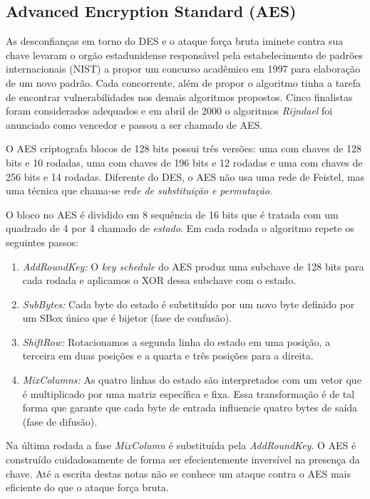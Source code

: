 
\subsection{Advanced Encryption Standard (AES)}
\label{sec:aes}

As desconfianças em torno do DES e o ataque força bruta iminete contra sua chave levaram o orgão estadunidense responsável pela estabelecimento de padrões internacionais (NIST) a propor um concurso acadêmico em 1997 para elaboração de um novo padrão.
Cada concorrente, além de propor o algoritmo tinha a tarefa de encontrar vulnerabilidades nos demais algoritmos propostos.
Cinco finalistas foram considerados adequados e em abril de 2000 o algoritmos {\em Rijndael} foi anunciado como vencedor e passou a ser chamado de AES.

O AES criptografa blocos de 128 bits possui três versões: uma com chaves de 128 bits e 10 rodadas, uma com chaves de 196 bits e 12 rodadas e uma com chaves de 256 bits e 14 rodadas.
Diferente do DES, o AES não usa uma rede de Feistel, mas uma técnica que chama-se {\em rede de substituição e permutação}.

O bloco no AES é dividido em 8 sequência de 16 bits que é tratada com um quadrado de 4 por 4 chamado de {\em estado}.
Em cada rodada o algoritmo repete os seguintes passos:
\begin{enumerate}
\item {\em AddRoundKey:} O {\em key schedule} do AES produz uma subchave de 128 bits para cada rodada e aplicamos o XOR dessa subchave com o estado.
\item {\em SubBytes:} Cada byte do estado é substituído por um novo byte definido por um SBox único que é bijetor (fase de confusão).
\item {\em ShiftRow:} Rotacionamos a segunda linha do estado em uma posição, a terceira em duas posições e a quarta e três posições para a direita.
\item {\em MixColumns:} As quatro linhas do estado são interpretados com um vetor que é multiplicado por uma matriz específica e fixa. Essa transformação é de tal forma que garante que cada byte de entrada influencie quatro bytes de saída (fase de difusão). 
\end{enumerate}

Na última rodada a fase {\em MixColumn} é substituída pela {\em AddRoundKey}.
O AES é construído cuidadosamente de forma ser efecientemente inversível na presença da chave.
Até a escrita destas notas não se conhece um ataque contra o AES mais eficiente do que o ataque força bruta.

